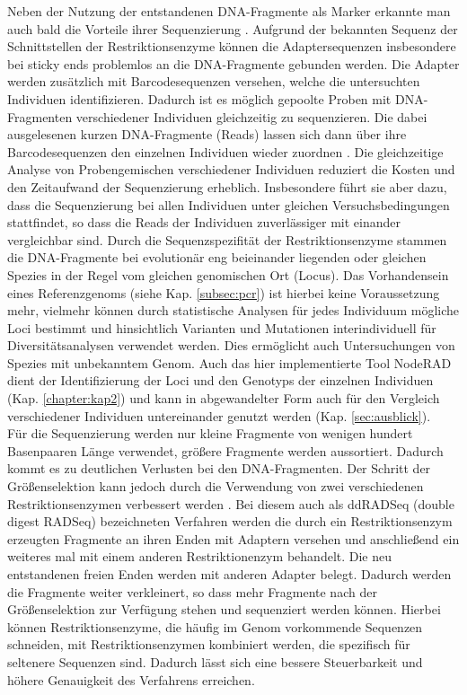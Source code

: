 Neben der Nutzung der entstandenen DNA-Fragmente als Marker erkannte man auch bald die Vorteile ihrer Sequenzierung \cite{baird_2008}. Aufgrund der bekannten Sequenz der Schnittstellen der Restriktionsenzyme können die Adaptersequenzen insbesondere bei sticky ends problemlos an die DNA-Fragmente gebunden werden. Die Adapter werden zusätzlich mit Barcodesequenzen versehen, welche die untersuchten Individuen identifizieren. Dadurch ist es möglich gepoolte Proben mit DNA-Fragmenten verschiedener Individuen gleichzeitig zu sequenzieren. Die dabei ausgelesenen kurzen DNA-Fragmente (Reads) lassen sich dann über ihre Barcodesequenzen den einzelnen Individuen wieder zuordnen \cite{davey_2010}. Die gleichzeitige Analyse von Probengemischen verschiedener Individuen reduziert die Kosten und den Zeitaufwand der Sequenzierung erheblich. Insbesondere führt sie aber dazu, dass die Sequenzierung bei allen Individuen unter gleichen Versuchsbedingungen stattfindet, so dass die Reads der Individuen zuverlässiger mit einander vergleichbar sind. Durch die Sequenzspezifität der Restriktionsenzyme stammen die DNA-Fragmente bei evolutionär eng beieinander liegenden oder gleichen Spezies in der Regel vom gleichen genomischen Ort (Locus). Das Vorhandensein eines Referenzgenoms (siehe Kap. \ref{subsec:pcr}) ist hierbei keine Voraussetzung mehr, vielmehr können durch statistische Analysen für jedes Individuum mögliche Loci bestimmt \cite{leggett_2014} und hinsichtlich Varianten und Mutationen interindividuell für Diversitätsanalysen verwendet werden. Dies ermöglicht auch Untersuchungen von Spezies mit unbekanntem Genom. Auch das hier implementierte Tool NodeRAD \cite{noderad} dient der Identifizierung der Loci und den Genotyps der einzelnen Individuen (Kap. \ref{chapter:kap2}) und kann in abgewandelter Form auch für den Vergleich verschiedener Individuen untereinander genutzt werden (Kap. \ref{sec:ausblick}).  \\

Für die Sequenzierung werden nur kleine Fragmente von wenigen hundert Basenpaaren Länge verwendet, größere Fragmente werden aussortiert. Dadurch kommt es zu deutlichen Verlusten bei den DNA-Fragmenten. Der Schritt der Größenselektion kann jedoch durch die Verwendung von zwei verschiedenen Restriktionsenzymen verbessert werden \cite{peterson_2012}. Bei diesem auch als ddRADSeq (double digest RADSeq) bezeichneten Verfahren werden die durch ein Restriktionsenzym erzeugten Fragmente an ihren Enden mit Adaptern versehen und anschließend ein weiteres mal mit einem anderen Restriktionenzym behandelt. Die neu entstandenen freien Enden werden mit anderen Adapter belegt. Dadurch werden die Fragmente weiter verkleinert, so dass mehr Fragmente nach der Größenselektion zur Verfügung stehen und sequenziert werden können. Hierbei können Restriktionsenzyme, die häufig im Genom vorkommende Sequenzen schneiden, mit Restriktionsenzymen kombiniert werden, die spezifisch für seltenere Sequenzen sind. Dadurch lässt sich eine bessere Steuerbarkeit und  höhere Genauigkeit des Verfahrens erreichen. \\

